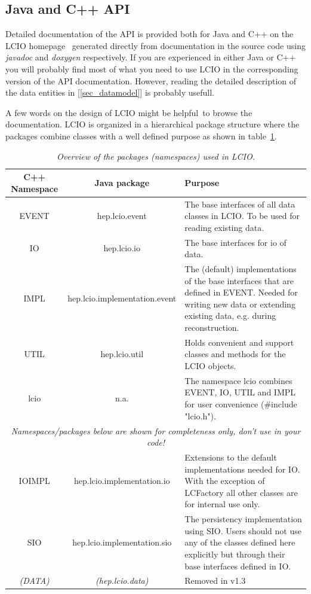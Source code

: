 \documentclass[twoside]{article}
\newcommand{\captionstyle}[1]{\textit{\small{#1}}}
\begin{document}
\subsection{Java and C++ API} \label{sec_api}
Detailed documentation of the API is provided both for Java and C++ on the 
LCIO homepage~\cite{lcio_home} generated directly  from documentation in the source code using 
{\em javadoc} and {\em doxygen} respectively.   
If you are experienced in either Java or C++ you will probably  find most of what you need to use LCIO in the 
corresponding version of the API documentation. However, reading the detailed description of the data entities in 
[\ref{sec_datamodel}] is probably usefull.
 
A few words on the design of LCIO might be helpful\ to browse the documentation.
LCIO is organized in a hierarchical package structure where the packages combine classes
with a well defined purpose as shown in table~\ref{tab_pkg}.  
\begin{table}[h]
\begin{center}
\begin{tabular}{|c|c|p{6cm}|}
\hline
\rule[-5mm]{0mm}{10mm} C++ Namespace  &  Java package    &  Purpose \\ \hline \hline

 EVENT  &  hep.lcio.event   & The base interfaces of all data classes in LCIO. To be used for reading existing
 data.\\ \hline
 IO  &  hep.lcio.io   &  The base interfaces for io of data.\\ \hline
 IMPL  &  hep.lcio.implementation.event   & The (default) implementations of
 the base interfaces that are defined in EVENT. Needed for writing new data or extending existing data, e.g.
 during reconstruction. \\ \hline
 UTIL  &  hep.lcio.util   & Holds convenient and support classes and methods for the LCIO objects.
 \\ \hline
lcio  &   n.a. & The namespace lcio combines EVENT, IO, UTIL and IMPL for user convenience
(\#include "lcio.h"). \\ \hline
   \multicolumn{3}{|c|}{\textit{\small Namespaces/packages below are shown for completeness only, don't use 
 in your code!}}         \\ \hline
 IOIMPL  &  hep.lcio.implementation.io   &  Extensions to the default implementations
 needed for IO. With the exception of LCFactory all other classes are for internal use only.\\ \hline
 SIO  &  hep.lcio.implementation.sio   & The persistency implementation using SIO.
 Users should not use any of the classes defined here explicitly but through their
 base interfaces defined in IO. \\ \hline
 \textit{\small (DATA)  } &   \textit{\small (hep.lcio.data)}   & Removed in v1.3  \\ \hline

\end{tabular}
\end{center}
\caption{\captionstyle{ Overview of the packages (namespaces) used in LCIO.}}
\label{tab_pkg}
\end{table}
\end{document}
